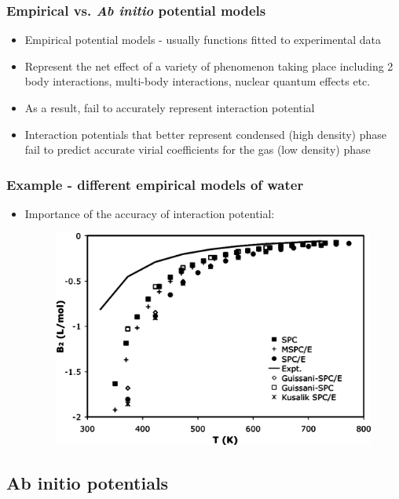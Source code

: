 \documentclass[xcolor=svgnames]{beamer}
\begin{document}
		\begin{frame}
			\frametitle{Empirical vs. \emph{Ab initio} potential models}
			\begin{itemize} 
				\justifying
				\item Empirical potential models - usually functions fitted to experimental data
				\item Represent the net effect of a variety of phenomenon taking place including 2 body interactions, multi-body interactions, nuclear quantum effects etc.  
				\item As a result, fail to accurately represent interaction potential
				\item Interaction potentials that better represent condensed (high density) phase fail to predict accurate virial coefficients for the gas (low density) phase
			\end{itemize}
		\end{frame}
		
		\begin{frame}
			\frametitle{Example - different empirical models of water}
			\begin{itemize}
				\justifying
				\item Importance of the accuracy of interaction potential\putCitation{Benjamin2007}:
				\begin{figure}
				\centering
				\includegraphics[scale=0.08,keepaspectratio]{ben2a.png}
				\end{figure}
			\end{itemize}
		\end{frame}
	\subsection{Ab initio potentials}
\end{document}
